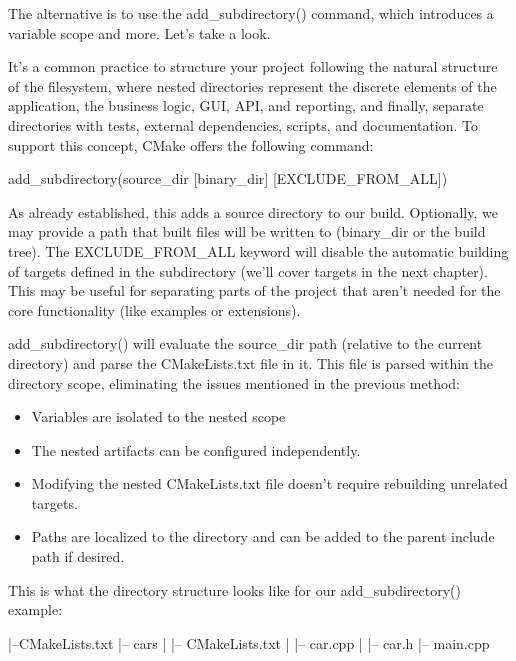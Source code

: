 The alternative is to use the add\_subdirectory() command, which introduces a variable scope and more. Let’s take a look.


It’s a common practice to structure your project following the natural structure of the filesystem, where nested directories represent the discrete elements of the application, the business logic, GUI, API, and reporting, and finally, separate directories with tests, external dependencies, scripts, and documentation. To support this concept, CMake offers the following command:

\begin{shell}
add_subdirectory(source_dir [binary_dir] [EXCLUDE_FROM_ALL])
\end{shell}

As already established, this adds a source directory to our build. Optionally, we may provide a path that built files will be written to (binary\_dir or the build tree). The EXCLUDE\_FROM\_ALL keyword will disable the automatic building of targets defined in the subdirectory (we’ll cover targets in the next chapter). This may be useful for separating parts of the project that aren’t needed for the core functionality (like examples or extensions).

add\_subdirectory() will evaluate the source\_dir path (relative to the current directory) and parse the CMakeLists.txt file in it. This file is parsed within the directory scope, eliminating the issues mentioned in the previous method:

\begin{itemize}
\item
Variables are isolated to the nested scope

\item
The nested artifacts can be configured independently.

\item
Modifying the nested CMakeLists.txt file doesn’t require rebuilding unrelated targets.

\item
Paths are localized to the directory and can be added to the parent include path if desired.
\end{itemize}

This is what the directory structure looks like for our add\_subdirectory() example:

\begin{shell}
|--CMakeLists.txt
|-- cars
|   |-- CMakeLists.txt
|   |-- car.cpp
|   |-- car.h
|-- main.cpp
\end{shell}

